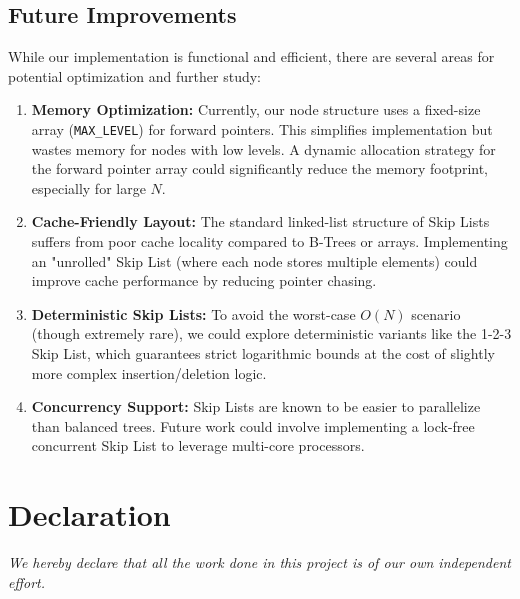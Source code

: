 \documentclass[a4paper,12pt]{article}
\begin{document}
\subsection{Future Improvements}
While our implementation is functional and efficient, there are several areas for potential optimization and further study:

\begin{enumerate}
    \item \textbf{Memory Optimization:} Currently, our node structure uses a fixed-size array (\texttt{MAX\_LEVEL}) for forward pointers. This simplifies implementation but wastes memory for nodes with low levels. A dynamic allocation strategy for the forward pointer array could significantly reduce the memory footprint, especially for large $N$.
    
    \item \textbf{Cache-Friendly Layout:} The standard linked-list structure of Skip Lists suffers from poor cache locality compared to B-Trees or arrays. Implementing an "unrolled" Skip List (where each node stores multiple elements) could improve cache performance by reducing pointer chasing.
    
    \item \textbf{Deterministic Skip Lists:} To avoid the worst-case $O(N)$ scenario (though extremely rare), we could explore deterministic variants like the 1-2-3 Skip List, which guarantees strict logarithmic bounds at the cost of slightly more complex insertion/deletion logic.
    
    \item \textbf{Concurrency Support:} Skip Lists are known to be easier to parallelize than balanced trees. Future work could involve implementing a lock-free concurrent Skip List to leverage multi-core processors.
\end{enumerate}

\section{Declaration}
\textit{We hereby declare that all the work done in this project is of our own independent effort.}
\end{document}
